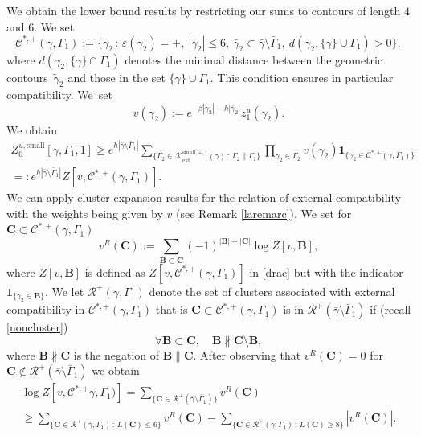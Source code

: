 \documentclass[JEP,XML,SOM,Unicode, NoFloatCountersInSection]{cedram}
\let\mathcal\mathscr
\newcommand{\sep}{\,:\,}
\numberwithin{equation}{section}
\theoremstyle{plain}
\theoremstyle{definition}
\newcommand{\ext}{\mathrm{ext}}
\newcommand{\sm}{\mathrm{small}}
\newcommand{\ind}{\mathbf{1}}
\newcommand{\cC}{{\ensuremath{\mathcal C}} }
\newcommand{\cR}{{\ensuremath{\mathcal R}} }
\newcommand{\cK}{{\ensuremath{\mathcal K}} }
\newcommand{\bC}{{\ensuremath{\mathbf C}} }
\newcommand{\bB}{{\ensuremath{\mathbf B}} }
\newcommand{\gb}{\beta}
\newcommand{\gep}{\varepsilon}
\newcommand{\gG}{\Gamma}
\begin{document}
We obtain the lower bound results by restricting our sums to contours of length $4$ and $6$.
We set
\begin{equation}\label{csta}
\cC^{*,+}(\gamma,\gG_1):=\{ \gamma_2 \sep \gep(\gamma_2)=+, \ |\tilde \gamma_2|\le 6,\ \bar \gamma_2\subset \bar \gamma \setminus \bar \gG_1,\
d(\gamma_2, \{\gamma\}\cup \gG_1)>0 \},
\end{equation}
where $d(\gamma_2, \{\gamma\}\cap \gG_1)$ denotes the minimal distance between the geometric contours~$\tilde \gamma_2$ and those in the set $\{\gamma\}\cup \gG_1$. This condition ensures in particular compatibility. We~set
\[
v(\gamma_2):=e^{-\gb |\tilde\gamma_2|-h|\bar \gamma_2|}
z^u_{1}(\gamma_2).
\]
We obtain
\begin{multline}\label{drac}
Z^{u,\sm}_{0}[\gamma,\gG_1,1]
\ge e^{h|\bar \gamma \setminus \bar \gG_1|} \sum_{\{ \gG_2 \in \cK^{\sm,+,1}_{\ext}(\gamma) \sep \gG_2 \parallel \gG_1\}} \prod_{\gamma_2\in \gG_2 }
v(\gamma_2)\ind_{\{\gamma_2\in \cC^{*,+}(\gamma,\gG_1)\}}\\
=:e^{h|\bar \gamma \setminus \bar \gG_1|}
Z[v,\cC^{*,+}(\gamma,\gG_1)].
\end{multline}
We can apply cluster expansion results for the relation of external compatibility with the weights being given by $v$ (see Remark \ref{laremarc}).
We set for $\bC\subset \cC^{*,+}(\gamma,\gG_1)$
\begin{equation}\label{modpot}
v^{R}(\bC):=\sum_{\bB\subset \bC} (-1)^{|\bB|+|\bC|} \log Z[v,\bB],
\end{equation}
where $Z[v,\bB]$ is defined as $Z[v,\cC^{*,+}(\gamma,\gG_1)]$ in \eqref{drac} but with the indicator $\ind_{\{\gamma_2\in \bB\}}$.
We let $\cR^+(\gamma,\gG_1)$ denote the set of clusters associated with external compatibility in $\cC^{*,+}(\gamma,\gG_1)$
that is $\bC\subset \cC^{*,+}(\gamma,\gG_1)$ is in $\cR^+(\bar \gamma\setminus\bar \gG_1)$ if (recall \eqref{noncluster})
\begin{equation*}
\forall \bB \subset \bC, \quad \bB\nparallel \bC\setminus \bB,
\end{equation*}
where $\bB\nparallel \bC$ is the negation of $\bB\parallel \bC$.
After observing that $v^{R}(\bC)=0$ for $\bC\notin \cR^+(\bar \gamma\setminus\bar \gG_1)$
we obtain
\begin{multline}\label{dox}
\log Z[v,\cC^{*,+}\gamma,\gG_1)]= \sum_{\{ \bC\in \cR^+(\bar \gamma\setminus\bar \gG_1)\}} v^R(\bC)
\\
\ge \sum_{\{ \bC\in \cR^+(\gamma, \gG_1) \sep L(\bC)\le 6\}} v^R(\bC)
-\sum_{\{ \bC\in \cR^+(\gamma, \gG_1) \sep L(\bC)\ge 8\}} \left|v^R(\bC)\right|.
\end{multline}
\end{document}

